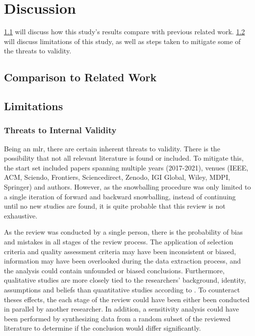 \chapter{Discussion}
\label{ch:discussion}
\cref{ch:discussion:comparison_to_related_work} will discuss how this study's results compare with previous related work.
\cref{ch:discussion:limitations} will discuss limitations of this study, as well as steps taken to mitigate some of the threats to validity.

\section{Comparison to Related Work}
\label{ch:discussion:comparison_to_related_work}
\section{Limitations}
\label{ch:discussion:limitations}
\subsection{Threats to Internal Validity}
Being an \acrshort{mlr}, there are certain inherent threats to validity.
There is the possibility that not all relevant literature is found or included.
To mitigate this, the start set included papers spanning multiple years (2017-2021), venues (IEEE, ACM, Sciendo, Frontiers, Sciencedirect, Zenodo, IGI Global, Wiley, MDPI, Springer) and authors.
However, as the snowballing procedure was only limited to a single iteration of forward and backward snowballing, instead of continuing until no new studies are found, it is quite probable that this review is not exhaustive.

As the review was conducted by a single person, there is the probability of bias and mistakes in all stages of the review process.
The application of selection criteria and quality assessment criteria may have been inconsistent or biased, information may have been overlooked during the data extraction process, and the analysis could contain unfounded or biased conclusions.
Furthermore, qualitative studies are more closely tied to the researchers' background, identity, assumptions and beliefs than quantitative studies according to \textcite{Oates2005}.
To counteract theses effects, the each stage of the review could have been either been conducted in parallel by another researcher.
In addition, a sensitivity analysis could have been performed by synthesizing data from a random subset of the reviewed literature to determine if the conclusion would differ significantly.

